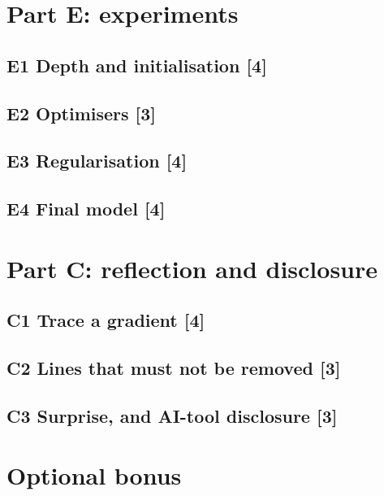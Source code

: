\documentclass[11pt,a4paper]{article}
\begin{document}
\section{Part E: experiments}
\subsection*{E1 Depth and initialisation \hfill [4]}
\begin{respond}[10\baselineskip]\end{respond}
\subsection*{E2 Optimisers \hfill [3]}
\begin{respond}[10\baselineskip]\end{respond}
\subsection*{E3 Regularisation \hfill [4]}
\begin{respond}[13\baselineskip]\end{respond}
\subsection*{E4 Final model \hfill [4]}
\begin{respond}[14\baselineskip]\end{respond}

\section{Part C: reflection and disclosure}
\subsection*{C1 Trace a gradient \hfill [4]}
\begin{respond}[10\baselineskip]\end{respond}
\subsection*{C2 Lines that must not be removed \hfill [3]}
\begin{respond}[8\baselineskip]\end{respond}
\subsection*{C3 Surprise, and AI-tool disclosure \hfill [3]}
\begin{respond}[10\baselineskip]\end{respond}

\section*{Optional bonus}
\begin{respond}[6\baselineskip]\end{respond}
\end{document}
